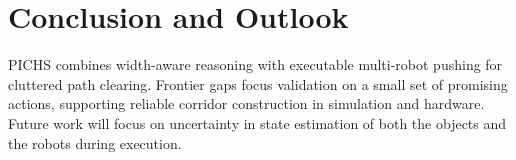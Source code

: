 \section{Conclusion and Outlook}
\label{sec:conclusion}

PICHS combines width-aware reasoning with executable multi-robot pushing for
cluttered path clearing. Frontier gaps focus validation on a small set of
promising actions, supporting reliable corridor construction in simulation and
hardware.
Future work will focus on uncertainty in state estimation of both the objects and the robots during execution.
